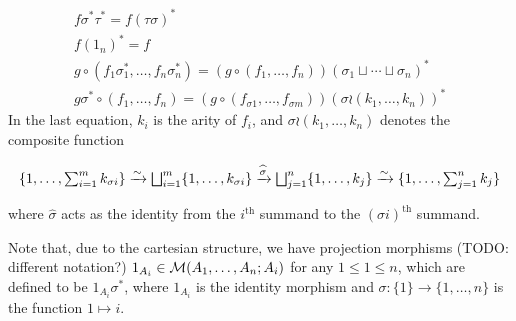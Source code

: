 \begin{definition}
\begin{enumerate}
     \begin{gather*}
       f \sigma^* \tau^* = f(\tau\sigma)^*\\
       f (1_n)^* = f\\
       g\circ (f_1 \sigma_1^* ,\dots, f_n \sigma_n^*) = (g \circ (f_1,\dots,f_n))(\sigma_1\sqcup \cdots \sqcup \sigma_n)^*\\
       g\sigma^* \circ (f_1,\dots,f_n) = (g\circ (f_{\sigma 1},\dots, f_{\sigma m}))(\sigma \wr (k_1,\dots,k_n))^*
     \end{gather*}
     In the last equation, $k_i$ is the arity of $f_i$, and $\sigma \wr (k_1,\dots,k_n)$ denotes the composite function
     \begin{footnotesize}
     \begin{equation*}
       \{1,\dots,\textstyle\sum_{i=1}^m k_{\sigma i} \}
       \xrightarrow{\sim} \bigsqcup_{i=1}^m \{1,\dots,k_{\sigma i}\}
       \xrightarrow{\widehat{\sigma}} \bigsqcup_{j=1}^n \{1,\dots,k_{j}\}
       \xrightarrow{\sim} \{1,\dots,\textstyle\sum_{j=1}^n k_j \}
     \end{equation*}
     \end{footnotesize}
     where $\widehat{\sigma}$ acts as the identity from the $i^{\mathrm{th}}$ summand to the $(\sigma i)^{\mathrm{th}}$ summand.
  \end{enumerate}
\end{definition}

Note that, due to the cartesian structure, we have projection morphisms (TODO: different notation?) $1_{A_i} \in \mathcal{M}(A_1, \dots, A_n; A_i)$ for any $1 \leq 1 \leq n$, which are defined to be $1_{A_i} \sigma^*$, where $1_{A_i}$ is the identity morphism and $\sigma : \{1\} \to \{1, \dots, n\}$ is the function $1 \mapsto i$.

